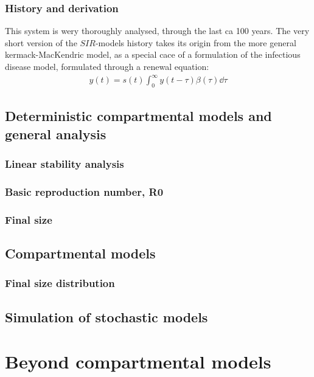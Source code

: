 \documentclass{article}
\begin{document}
\subsubsection{History and derivation}
This system is wery thoroughly analysed, through the last ca 100 years. 
The very short version of the $SIR$-models history takes its origin from the more general kermack-MacKendric model, as a special cace of a formulation of the infectious disease model, formulated through a renewal equation:
\begin{align*}
	y(t) = s(t) \int_{0}^{\infty} y(t - \tau) \beta(\tau) \dd \tau
\end{align*}

\subsection{Deterministic compartmental models and general analysis}

\subsubsection{Linear stability analysis}

\subsubsection{Basic reproduction number, R0}

\subsubsection{Final size}

\subsection{Compartmental models} \label{}

\subsubsection{Final size distribution}

\subsection{Simulation of stochastic models}


\section{Beyond compartmental models}
\end{document}
